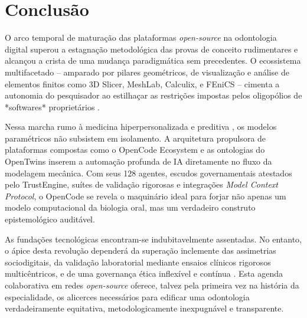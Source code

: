 \section{Conclusão}

O arco temporal de maturação das plataformas \textit{open-source} na odontologia digital superou a estagnação metodológica das provas de conceito rudimentares e alcançou a crista de uma mudança paradigmática sem precedentes. O ecossistema multifacetado -- amparado por pilares geométricos, de visualização e análise de elementos finitos como 3D Slicer, MeshLab, Calculix, e FEniCS -- cimenta a autonomia do pesquisador ao estilhaçar as restrições impostas pelos oligopólios de *softwares* proprietários \cite{robles2023opentwins}.

Nessa marcha rumo à medicina hiperpersonalizada e preditiva \cite{digital2026technology}, os modelos paramétricos não subsistem em isolamento. A arquitetura propulsora de plataformas compostas como o OpenCode Ecosystem e as ontologias do OpenTwins inserem a automação profunda de IA diretamente no fluxo da modelagem mecânica. Com seus 128 agentes, escudos governamentais atestados pelo TrustEngine, suítes de validação rigorosas e integrações \textit{Model Context Protocol}, o OpenCode se revela o maquinário ideal para forjar não apenas um modelo computacional da biologia oral, mas um verdadeiro construto epistemológico auditável.


As fundações tecnológicas encontram-se indubitavelmente assentadas. No entanto, o ápice desta revolução dependerá da superação inclemente das assimetrias sociodigitais, da validação laboratorial mediante ensaios clínicos rigorosos multicêntricos, e de uma governança ética inflexível e contínua \cite{realising2026digital, frota2025sus}. Esta agenda colaborativa em redes \textit{open-source} oferece, talvez pela primeira vez na história da especialidade, os alicerces necessários para edificar uma odontologia verdadeiramente equitativa, metodologicamente inexpugnável e transparente.
